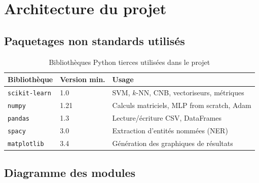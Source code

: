 \documentclass[12pt,a4paper]{article}
\begin{document}
\section{Architecture du projet}

\subsection{Paquetages non standards utilisés}

\begin{table}[H]
\centering
\caption{Bibliothèques Python tierces utilisées dans le projet}
\label{tab:packages}
\begin{tabular}{lll}
\toprule
\textbf{Bibliothèque} & \textbf{Version min.} & \textbf{Usage} \\
\midrule
\texttt{scikit-learn} & 1.0 & SVM, $k$-NN, CNB, vectoriseurs, métriques \\
\texttt{numpy}        & 1.21 & Calculs matriciels, MLP from scratch, Adam \\
\texttt{pandas}       & 1.3  & Lecture/écriture CSV, DataFrames \\
\texttt{spacy}        & 3.0  & Extraction d'entités nommées (NER) \\
\texttt{matplotlib}   & 3.4  & Génération des graphiques de résultats \\
\bottomrule
\end{tabular}
\end{table}

\subsection{Diagramme des modules}
\end{document}

